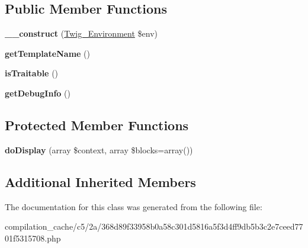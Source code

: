 \subsection*{Public Member Functions}
\begin{DoxyCompactItemize}
\item 
\hypertarget{class_____twig_template__c52a368d89f33958b0a58c301d5816a5f3d4ff9db5b3c2e7ceed7701f5315708_a4f8326243132c1450a81e0a817aa1be7}{}{\bfseries \+\_\+\+\_\+construct} (\hyperlink{class_twig___environment}{Twig\+\_\+\+Environment} \$env)\label{class_____twig_template__c52a368d89f33958b0a58c301d5816a5f3d4ff9db5b3c2e7ceed7701f5315708_a4f8326243132c1450a81e0a817aa1be7}

\item 
\hypertarget{class_____twig_template__c52a368d89f33958b0a58c301d5816a5f3d4ff9db5b3c2e7ceed7701f5315708_a621a3ccd148ed8b9e937da6959c98f39}{}{\bfseries get\+Template\+Name} ()\label{class_____twig_template__c52a368d89f33958b0a58c301d5816a5f3d4ff9db5b3c2e7ceed7701f5315708_a621a3ccd148ed8b9e937da6959c98f39}

\item 
\hypertarget{class_____twig_template__c52a368d89f33958b0a58c301d5816a5f3d4ff9db5b3c2e7ceed7701f5315708_aa9eb89be270f6afc256ef5e272b78a63}{}{\bfseries is\+Traitable} ()\label{class_____twig_template__c52a368d89f33958b0a58c301d5816a5f3d4ff9db5b3c2e7ceed7701f5315708_aa9eb89be270f6afc256ef5e272b78a63}

\item 
\hypertarget{class_____twig_template__c52a368d89f33958b0a58c301d5816a5f3d4ff9db5b3c2e7ceed7701f5315708_abd0ecb0136f4228db2bd963bfc1e20d7}{}{\bfseries get\+Debug\+Info} ()\label{class_____twig_template__c52a368d89f33958b0a58c301d5816a5f3d4ff9db5b3c2e7ceed7701f5315708_abd0ecb0136f4228db2bd963bfc1e20d7}

\end{DoxyCompactItemize}
\subsection*{Protected Member Functions}
\begin{DoxyCompactItemize}
\item 
\hypertarget{class_____twig_template__c52a368d89f33958b0a58c301d5816a5f3d4ff9db5b3c2e7ceed7701f5315708_adb62b7c226e07d30f836ed16158d924f}{}{\bfseries do\+Display} (array \$context, array \$blocks=array())\label{class_____twig_template__c52a368d89f33958b0a58c301d5816a5f3d4ff9db5b3c2e7ceed7701f5315708_adb62b7c226e07d30f836ed16158d924f}

\end{DoxyCompactItemize}
\subsection*{Additional Inherited Members}


The documentation for this class was generated from the following file\+:\begin{DoxyCompactItemize}
\item 
compilation\+\_\+cache/c5/2a/368d89f33958b0a58c301d5816a5f3d4ff9db5b3c2e7ceed7701f5315708.\+php\end{DoxyCompactItemize}
